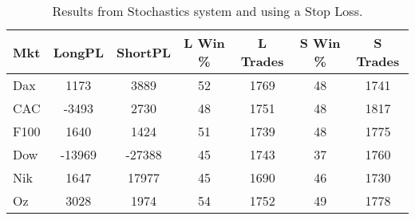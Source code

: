 \begin{table}[ht]
\centering
\caption[Stochastics system with stop loss]{Results from Stochastics system and using a Stop Loss.} 
\label{tab:stoch_results_sloss}
\begin{tabular}{lcccccc}
  \toprule Mkt & LongPL & ShortPL & L Win \% & L Trades & S Win \% & S Trades \\ 
  \midrule Dax & 1173 & 3889 & 52 & 1769 & 48 & 1741 \\ 
  CAC & -3493 & 2730 & 48 & 1751 & 48 & 1817 \\ 
  F100 & 1640 & 1424 & 51 & 1739 & 48 & 1775 \\ 
  Dow & -13969 & -27388 & 45 & 1743 & 37 & 1760 \\ 
  Nik & 1647 & 17977 & 45 & 1690 & 46 & 1730 \\ 
  Oz & 3028 & 1974 & 54 & 1752 & 49 & 1778 \\ 
   \bottomrule \end{tabular}
\end{table}
